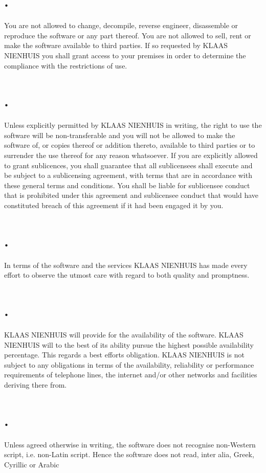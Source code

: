\documentclass[letterpaper,10pt,english]{sphinxmanual}
\begin{document}
\section{.}
\label{Access:id3}
You are not allowed to change, decompile, reverse engineer, disassemble or reproduce the software or any part thereof. You are not allowed to sell, rent or make the software available to third parties. If so requested by KLAAS NIENHUIS you shall grant access to your premises in order to determine the compliance with the restrictions of use.


\section{.}
\label{Access:id4}
Unless explicitly permitted by KLAAS NIENHUIS in writing, the right to use the software will be non-transferable and you will not be allowed to make the software of, or copies thereof or addition thereto, available to third parties or to surrender the use thereof for any reason whatsoever. If you are explicitly allowed to grant sublicences, you shall guarantee that all sublicensees shall execute and be subject to a sublicensing agreement, with terms that are in accordance with these general terms and conditions. You shall be liable for sublicensee conduct that is prohibited under this agreement and sublicensee conduct that would have constituted breach of this agreement if it had been engaged it by you.


\section{.}
\label{Access:id5}
In terms of the software and the services KLAAS NIENHUIS has made every effort to observe the utmost care with regard to both quality and promptness.


\section{.}
\label{Access:id6}
KLAAS NIENHUIS will provide for the availability of the software. KLAAS NIENHUIS will to the best of its ability pursue the highest possible availability percentage. This regards a best efforts obligation. KLAAS NIENHUIS is not subject to any obligations in terms of the availability, reliability or performance requirements of telephone lines, the internet and/or other networks and facilities deriving there from.


\section{.}
\label{Access:id7}
Unless agreed otherwise in writing, the software does not recognise non-Western script, i.e. non-Latin script. Hence the software does not read, inter alia, Greek, Cyrillic or Arabic
\end{document}
